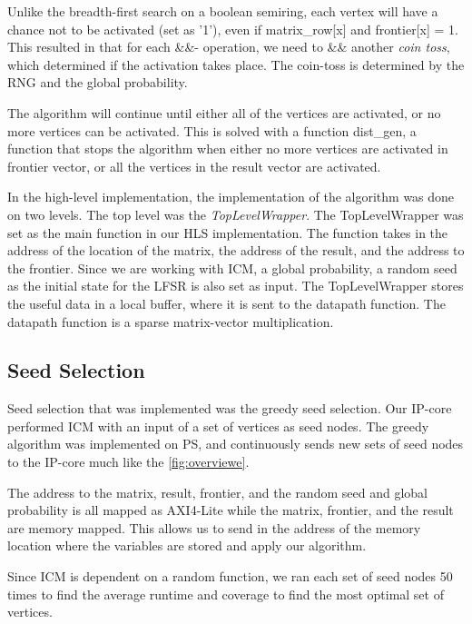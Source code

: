 Unlike the breadth-first search on a boolean semiring, each vertex will have a chance not to be activated (set as '1'), even if matrix\_row[x] and frontier[x] = 1. This resulted in that for each \&\&- operation, we need to \&\& another \textit{coin toss}, which determined if the activation takes place. The coin-toss is determined by the RNG and the global probability. 

The algorithm will continue until either all of the vertices are activated, or no more vertices can be activated. This is solved with a function dist\_gen, a function that stops the algorithm when either no more vertices are activated in frontier vector, or all the vertices in the result vector are activated. 

In the high-level implementation, the implementation of the algorithm was done on two levels. The top level was the \textit{TopLevelWrapper}. The TopLevelWrapper was set as the main function in our HLS implementation. The function takes in the address of the location of the matrix, the address of the result, and the address to the frontier. Since we are working with ICM, a global probability, a random seed as the initial state for the LFSR is also set as input. The  TopLevelWrapper stores the useful data in a local buffer, where it is sent to the datapath function. The datapath function is a sparse matrix-vector multiplication. 






\subsection{Seed Selection}
Seed selection that was implemented was the greedy seed selection. Our IP-core performed ICM with an input of a set of vertices as seed nodes. The greedy algorithm was implemented on PS, and continuously sends new sets of seed nodes to the IP-core much like the \ref{fig:overviewe}. 


The address to the matrix, result, frontier, and the random seed and global probability is all mapped as AXI4-Lite while the matrix, frontier, and the result are memory mapped. This allows us to send in the address of the memory location where the variables are stored and apply our algorithm. 
 
Since ICM is dependent on a random function, we ran each set of seed nodes 50 times to find the average runtime and coverage to find the most optimal set of vertices.

